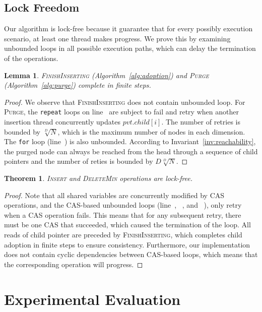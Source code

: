 \documentclass[10pt,journal,letter,compsoc]{IEEEtran}
\newtheorem{theorem}{Theorem}
\newtheorem{lemma}{Lemma}
\begin{document}
\subsection{Lock Freedom}
Our algorithm is lock-free because it guarantee that for every possibly execution scenario, at least one thread makes progress.
We prove this by examining unbounded loops in all possible execution paths, which can delay the termination of the operations.
\begin{lemma} \label{lmm:finitestep}
    \textsc{FinishInserting} (Algorithm~\ref{alg:adoption}) and \textsc{Purge} (Algorithm~\ref{alg:purge}) complete in finite steps.
\end{lemma}
\begin{proof}
    We observe that \textsc{FinishInserting} does not contain unbounded loop.
    For \textsc{Purge}, the \texttt{repeat} loops on line~ are subject to fail and retry when another insertion thread concurrently updates $pvt.child[i]$.
    The number of retries is bounded by $\sqrt[D]{N}$, which is the maximum number of nodes in each dimension.
    The \texttt{for} loop (line~) is also unbounded.
    According to Invariant~\ref{inv:reachability}, the purged node can always be reached from the head through a sequence of child pointers and the number of reties is bounded by $D \sqrt[D]{N}$.
\end{proof}

\begin{theorem}
    \textsc{Insert} and \textsc{DeleteMin} operations are lock-free.
\end{theorem}
\begin{proof}
    Note that all shared variables are concurrently modified by CAS operations, and the CAS-based unbounded loops (line~, ~, and ~), only retry when a CAS operation fails.
    This means that for any subsequent retry, there must be one CAS that succeeded, which caused the termination of the loop.
    All reads of child pointer are preceded by \textsc{FinishInserting}, which completes child adoption in finite steps to ensure consistency.
    Furthermore, our implementation does not contain cyclic dependencies between CAS-based loops, which means that the corresponding operation will progress.
\end{proof}

\section{Experimental Evaluation}
\label{sec:experiment}
\end{document}
